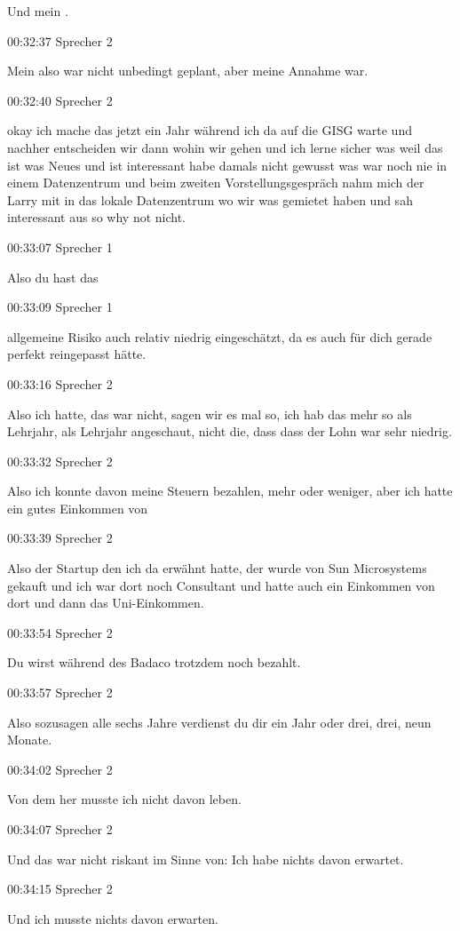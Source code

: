 Und mein .

00:32:37 Sprecher 2

Mein also war nicht unbedingt geplant, aber meine Annahme war.

00:32:40 Sprecher 2

okay ich mache das jetzt ein Jahr während ich da auf die GISG warte und
nachher entscheiden wir dann wohin wir gehen und ich lerne sicher was
weil das ist was Neues und ist interessant habe damals nicht gewusst was
war noch nie in einem Datenzentrum und beim zweiten Vorstellungsgespräch
nahm mich der Larry mit in das lokale Datenzentrum wo wir was gemietet
haben und sah interessant aus so why not nicht.

00:33:07 Sprecher 1

Also du hast das

00:33:09 Sprecher 1

allgemeine Risiko auch relativ niedrig eingeschätzt, da es auch für dich
gerade perfekt reingepasst hätte.

00:33:16 Sprecher 2

Also ich hatte, das war nicht, sagen wir es mal so, ich hab das mehr so
als Lehrjahr, als Lehrjahr angeschaut, nicht die, dass dass der Lohn war
sehr niedrig.

00:33:32 Sprecher 2

Also ich konnte davon meine Steuern bezahlen, mehr oder weniger, aber
ich hatte ein gutes Einkommen von

00:33:39 Sprecher 2

Also der Startup den ich da erwähnt hatte, der wurde von Sun
Microsystems gekauft und ich war dort noch Consultant und hatte auch ein
Einkommen von dort und dann das Uni-Einkommen.

00:33:54 Sprecher 2

Du wirst während des Badaco trotzdem noch bezahlt.

00:33:57 Sprecher 2

Also sozusagen alle sechs Jahre verdienst du dir ein Jahr oder drei,
drei, neun Monate.

00:34:02 Sprecher 2

Von dem her musste ich nicht davon leben.

00:34:07 Sprecher 2

Und das war nicht riskant im Sinne von: Ich habe nichts davon erwartet.

00:34:15 Sprecher 2

Und ich musste nichts davon erwarten.

